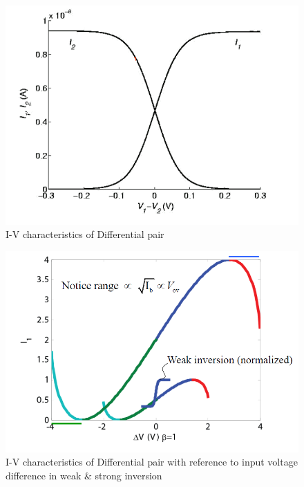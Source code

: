  \begin{figure}[htbp]
  \centering
  \includegraphics[scale=0.6]{pics/I-V_characteristics_of_Differential_pair.png}
  \caption{I-V characteristics of Differential pair}
  \label{fig:I-V_characteristics_of_Differential_pair}
\end{figure}




\begin{figure}[htbp]
  \centering
  \includegraphics[scale=0.6]{pics/Differential_pair_in_weak_strong_inversion.png}
  \caption{I-V characteristics of Differential pair with reference to input voltage difference in weak $\&$ strong inversion}
  \label{fig:Differential_pair_in_weak_strong_inversion}
\end{figure}


